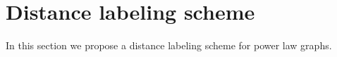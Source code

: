 \section{Distance labeling scheme}\label{Sec:Distance}
In this section we propose a distance labeling scheme for power law graphs. 

